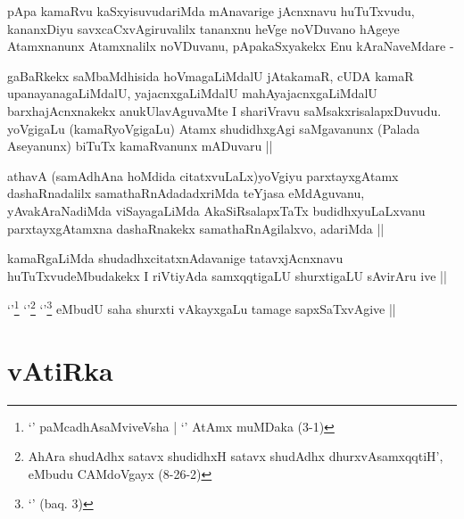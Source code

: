 
\begin{artha}
pApa kamaRvu kaSxyisuvudariMda mAnavarige jAcnxnavu huTuTxvudu,
kananxDiyu savxcaCxvAgiruvalilx tananxnu heVge noVDuvano hAgeye
Atamxnanunx Atamxnalilx noVDuvanu, pApakaSxyakekx Enu kAraNaveMdare -
\end{artha}

\begin{artha}
gaBaRkekx saMbaMdhisida hoVmagaLiMdalU jAtakamaR, cUDA kamaR
upanayanagaLiMdalU, yajacnxgaLiMdalU mahAyajacnxgaLiMdalU
barxhajAcnxnakekx anukUlavAguvaMte I shariVravu
saMsakxrisalapxDuvudu. yoVgigaLu (kamaRyoVgigaLu) Atamx shudidhxgAgi
saMgavanunx (Palada Aseyanunx) biTuTx kamaRvanunx mADuvaru ||
\end{artha}


\begin{artha}
athavA (samAdhAna hoMdida citatxvuLaLx)yoVgiyu parxtayxgAtamx
dashaRnadalilx samathaRnAdadadxriMda teYjasa eMdAguvanu,
yAvakAraNadiMda viSayagaLiMda AkaSiRsalapxTaTx budidhxyuLaLxvanu
parxtayxgAtamxna dashaRnakekx samathaRnAgilalxvo, adariMda ||
\end{artha}


\begin{artha}
kamaRgaLiMda shudadhxcitatxnAdavanige tatavxjAcnxnavu
huTuTxvudeMbudakekx I riVtiyAda samxqqtigaLU shurxtigaLU sAvirAru ive ||
\end{artha}


\begin{artha}
`\stext'\footnote{`\stext' paMcadhAsaMviveVsha | `\stext' AtAmx
    muMDaka (3-1)} `\stext'\footnote{AhAra shudAdhx satavx shudidhxH
    satavx shudAdhx dhurxvAsamxqqtiH', eMbudu CAMdoVgayx (8-26-2)}
  `\stext'\footnote{`\stext' (baq. 3)} eMbudU saha shurxti vAkayxgaLu tamage sapxSaTxvAgive ||
\end{artha}

\section*{vAtiRka}



